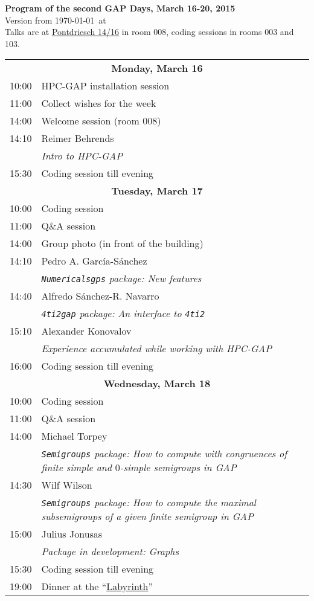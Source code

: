 \documentclass[12pt,a4paper]{article}
\begin{document}
\begin{center}
{\huge\textbf{Program of the second GAP Days, March 16-20, 2015}\\[2mm]}
Version from \today\ at \currenttime\\[2mm]
Talks are at \href{https://maps.google.com/maps?q=Pontdriesch+14,+Aachen,+Germany&hl=en&ll=50.778617,6.080579&spn=0.004993,0.008969&sll=37.0625,-95.677068&sspn=50.777825,73.476563&oq=pontdriesch+14+&hnear=Pontdriesch+14,+Mitte+52062+Aachen,+Germany&t=m&z=17}{Pontdriesch 14/16}
in room 008, coding sessions in rooms 003 and 103.
\end{center}

\newcommand{\talk}[3]{#1 & #2 \\ & \textit{#3} \\}

\newcommand{\newday}[1]{\multicolumn{2}{c}{{\large\textbf{#1}}} \\[1em]}


\begin{tabular}{rp{14.5cm}}
%
\newday{Monday, March 16}
10:00 & HPC-GAP installation session \\
11:00 & Collect wishes for the week \\
14:00 & Welcome session (room 008) \\
\talk{14:10}{Reimer Behrends}{Intro to \textsf{HPC-GAP}}
15:30 & Coding session till evening

%
%
\\
%
%
\newday{Tuesday, March 17}
10:00 & Coding session \\
11:00 & Q\&A session \\
14:00 & Group photo (in front of the building) \\ 
\talk{14:10}{Pedro A. García-Sánchez}{\texttt{Numericalsgps} package: New features}
\talk{14:40}{Alfredo Sánchez-R. Navarro}{\texttt{4ti2gap} package: An interface to \texttt{4ti2}}
\talk{15:10}{Alexander Konovalov}{Experience accumulated while working with \textsf{HPC-GAP}}
16:00 & Coding session till evening

%
%
\\
%
%
\newday{Wednesday, March 18}
10:00 & Coding session \\
11:00 & Q\&A session \\
\talk{14:00}{Michael Torpey}{\texttt{Semigroups} package: How to compute with congruences of finite simple and $0$-simple semigroups in \textsf{GAP}}
\talk{14:30}{Wilf Wilson}{\texttt{Semigroups} package: How to compute the maximal subsemigroups of a given finite semigroup in \textsf{GAP}}
\talk{15:00}{Julius Jonusas}{Package in development: Graphs}
15:30 & Coding session till evening \\
19:00 & Dinner at the ``\href{http://www.labyrinthaachen.de/}{Labyrinth}'' \\
\end{tabular}
\end{document}
